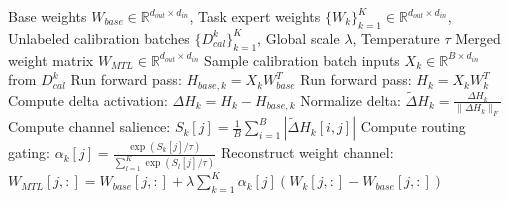\begin{algorithm}[tb]
\caption{EdgeMerge (Forward-Only Adaptive Model Merging)}
\label{alg:edgemerge}
\begin{algorithmic}[1]
 Base weights $W_{base} \in \mathbb{R}^{d_{out} \times d_{in}}$, Task expert weights $\{W_k\}_{k=1}^K \in \mathbb{R}^{d_{out} \times d_{in}}$, Unlabeled calibration batches $\{D_{cal}^k\}_{k=1}^K$, Global scale $\lambda$, Temperature $\tau$
 Merged weight matrix $W_{MTL} \in \mathbb{R}^{d_{out} \times d_{in}}$
    \STATE Sample calibration batch inputs $X_k \in \mathbb{R}^{B \times d_{in}}$ from $D_{cal}^k$
    \STATE Run forward pass: $H_{base, k} = X_k W_{base}^T$ 
    \STATE Run forward pass: $H_{k} = X_k W_k^T$ 
    \STATE Compute delta activation: $\Delta H_k = H_k - H_{base, k}$
    \STATE Normalize delta: $\tilde{\Delta} H_k = \frac{\Delta H_k}{\|\Delta H_k\|_F}$ 
        \STATE Compute channel salience: $S_k[j] = \frac{1}{B} \sum_{i=1}^B |\tilde{\Delta} H_k[i, j]|$
    \ENDFOR
\ENDFOR
{}
        \STATE Compute routing gating: $\alpha_k[j] = \frac{\exp(S_k[j] / \tau)}{\sum_{l=1}^K \exp(S_l[j] / \tau)}$ 
    \ENDFOR
    \STATE Reconstruct weight channel: $W_{MTL}[j, :] = W_{base}[j, :] + \lambda \sum_{k=1}^K \alpha_k[j] (W_k[j, :] - W_{base}[j, :])$
\ENDFOR
\end{algorithmic}
\end{algorithm}
